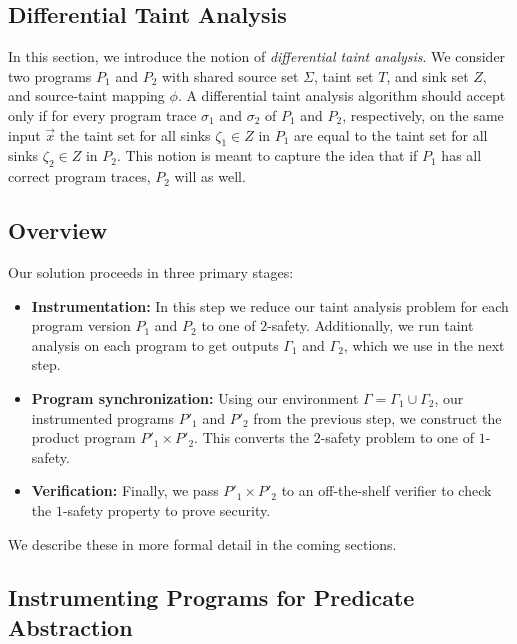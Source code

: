 \documentclass[letterpaper,twocolumn,10pt]{article}
\begin{document}
\subsection{Differential Taint Analysis}

In this section, we introduce the notion of \emph{differential taint analysis}.
We consider two programs $P_1$ and $P_2$ with shared
source set $\Sigma$, taint set $T$, and sink set $Z$, and source-taint mapping $\phi$. 
A differential taint analysis algorithm
should accept only if for every program trace $\sigma_1$ and $\sigma_2$ of $P_1$
and $P_2$, respectively, on the same input $\vec{x}$ the taint set for all sinks
$\zeta_1 \in Z$ in $P_1$ are equal to the taint set for all sinks $\zeta_2 \in Z$ in $P_2$.
This notion is meant to capture the idea that if $P_1$ has all correct program traces,
$P_2$ will as well.

\subsection{Overview}

Our solution proceeds in three primary stages:

\begin{itemize}
    \item \textbf{Instrumentation:} In this step we reduce our taint analysis problem for each program version $P_1$ and $P_2$ to one of $2$-safety.
    Additionally, we run taint analysis on each program to get outputs $\Gamma_1$ and $\Gamma_2$, which we use in the next step.
    \item \textbf{Program synchronization:} Using our environment $\Gamma = \Gamma_1 \cup \Gamma_2$, our instrumented programs $P'_1$ and $P'_2$ from 
    the previous step, we construct the product program $P'_1 \times P'_2$. This converts the $2$-safety problem to one of $1$-safety.
    \item \textbf{Verification:} Finally, we pass $P'_1 \times P'_2$ to an off-the-shelf verifier to check the $1$-safety property to
    prove security.
\end{itemize}

We describe these in more formal detail in the coming sections.

\subsection{Instrumenting Programs for Predicate Abstraction}

\end{document}
